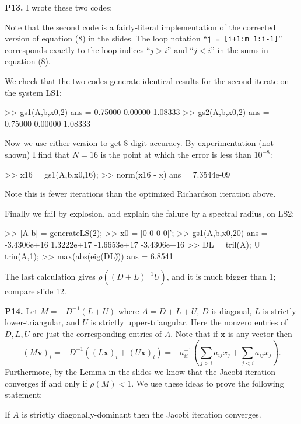 \documentclass[12pt]{amsart}
\newcommand{\bv}{\mathbf{v}}
\newcommand{\bx}{\mathbf{x}}
\newcommand{\mfile}[1]{
\bigskip
\bigskip
\begin{quote}
\bigskip
\VerbatimInput[frame=single,framesep=3mm,label=\fbox{\normalsize \textsl{\,#1\,}},fontfamily=courier,fontsize=\footnotesize]{#1}
\medskip
\end{quote}
}
\newcommand{\prob}[1]{\bigskip\medskip\noindent\large\textbf{#1.} \normalsize}
\begin{document}
\prob{P13}  I wrote these two codes:

\mfile{gs1.m}

\mfile{gs2.m}

\noindent Note that the second code is a fairly-literal implementation of the corrected version of equation (8) in the slides.  The loop notation ``\texttt{j = [i+1:m 1:i-1]}'' corresponds exactly to the loop indices ``$j>i$'' and ``$j<i$'' in the sums in equation (8).

We check that the two codes generate identical results for the second iterate on the system LS1:
\begin{mVerb}
>> gs1(A,b,x0,2)
ans =
  0.75000
  0.00000
  1.08333
>> gs2(A,b,x0,2)
ans =
  0.75000
  0.00000
  1.08333
\end{mVerb}

Now we use either version to get 8 digit accuracy.  By experimentation (not shown) I find that $N=16$ is the point at which the error is less than $10^{-8}$:
\begin{mVerb}
>> x16 = gs1(A,b,x0,16);
>> norm(x16 - x)
ans =    7.3544e-09
\end{mVerb}
Note this is fewer iterations than the optimized Richardson iteration above.

Finally we fail by explosion, and explain the failure by a spectral radius, on LS2:
\begin{mVerb}
>> [A b] = generateLS(2);
>> x0 = [0 0 0 0]';
>> gs1(A,b,x0,20)          %
ans =
  -3.4306e+16
  1.3222e+17
  -1.6653e+17
  -3.4306e+16
>> DL = tril(A);  U = triu(A,1);
>> max(abs(eig(DL\U)))
ans =  6.8541
\end{mVerb}
The last calculation gives $\rho((D+L)^{-1} U)$, and it is much bigger than 1; compare slide 12.


\prob{P14}  Let $M = - D^{-1}(L+U)$ where $A=D+L+U$, $D$ is diagonal, $L$ is strictly lower-triangular, and $U$ is strictly upper-triangular.  Here the nonzero entries of $D,L,U$ are just the corresponding entries of $A$.  Note that if $\bx$ is any vector then
    $$(M\bv)_i = - D^{-1} \left((L \bx)_i + (U \bx)_i\right) = - a_{ii}^{-1} \left(\sum_{j>i} a_{ij} x_j + \sum_{j<i} a_{ij} x_j\right).$$
Furthermore, by the Lemma in the slides we know that the Jacobi iteration converges if and only if $\rho(M) < 1$.  We use these ideas to prove the following statement:

\medskip
If $A$ is strictly diagonally-dominant then the Jacobi iteration converges.
\end{document}
